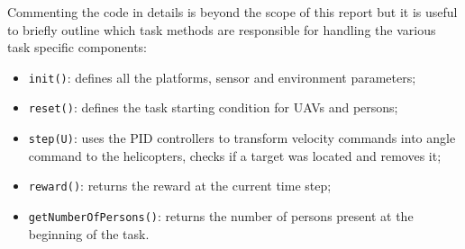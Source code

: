 \documentclass[a4paper,11pt]{report}
\newcommand\mytexttt[1]{\texttt{\hyphenchar\font=45\relax #1}}
\begin{document}
Commenting the code in details is beyond the scope of this report but it is useful to briefly outline which task methods are responsible for handling the various task specific components:
\begin{itemize}
\item\mytexttt{init()}: defines all the platforms, sensor and environment parameters;
\item\mytexttt{reset()}: defines the task starting condition for UAVs and persons;
\item\mytexttt{step(U)}: uses the PID controllers to transform velocity commands into angle command to the helicopters, checks if a target was located and removes it;
\item\mytexttt{reward()}: returns the reward at the current time step;
\item\mytexttt{getNumberOfPersons()}: returns the number of persons present at the beginning of the task.
\end{itemize}
\end{document}
